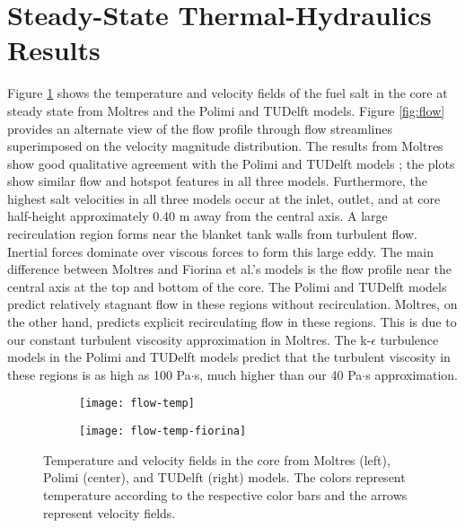 \section{Steady-State Thermal-Hydraulics Results}

Figure \ref{fig:flow-temp} shows the temperature and velocity fields of the
fuel salt in the core at steady state from Moltres and the Polimi and TUDelft
models. Figure \ref{fig:flow} provides an alternate view of the flow profile
through flow streamlines superimposed on the velocity magnitude distribution.
The results from Moltres show good qualitative agreement with the Polimi and
TUDelft models \cite{fiorina_modelling_2014}; the plots show similar
flow and hotspot features in all three models. Furthermore, the highest salt
velocities in all three models occur at the inlet, outlet, and at core
half-height approximately 0.40 m away from the central axis. A large
recirculation region forms near the blanket tank walls from turbulent flow.
Inertial forces dominate over viscous forces to form this large eddy. The main
difference between Moltres and Fiorina et al.'s models is the flow profile
near the central axis at the top and bottom of the core.
The Polimi and TUDelft models predict relatively stagnant flow in these
regions without recirculation. Moltres, on the other hand, predicts explicit
recirculating flow in these regions. This is due to our constant turbulent
viscosity approximation in Moltres. The k-$\epsilon$ turbulence models in the
Polimi and TUDelft models predict that the turbulent viscosity in these
regions is as high as 100 Pa$\cdot$s, much higher than our 40 Pa$\cdot$s
approximation.

\begin{figure}[htbp!]
    \centering
    \begin{subfigure}[t]{.365\textwidth}
        \centering
        \texttt{[image: flow-temp]}
    \end{subfigure}
    \hfill
    \begin{subfigure}[t]{.625\textwidth}
        \centering
        \texttt{[image: flow-temp-fiorina]}
    \end{subfigure}
    \caption{Temperature and velocity fields in the core from Moltres
    (left), Polimi (center), and TUDelft (right) models. The colors represent
    temperature according to the respective color bars and the arrows
    represent velocity fields.}
    \label{fig:flow-temp}
\end{figure}

